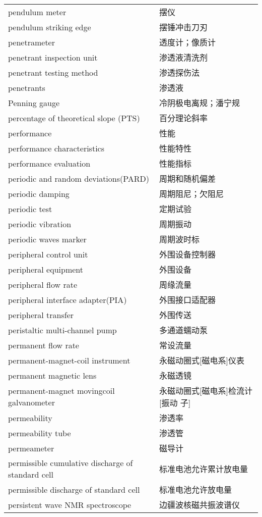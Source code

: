 \documentclass[
]{article}
\begin{document}
\begin{longtable}[]{@{}ll@{}}
pendulum meter & 摆仪 \\
pendulum striking edge & 摆锤冲击刀刃 \\
penetrameter & 透度计；像质计 \\
penetrant inspection unit & 渗透液清洗剂 \\
penetrant testing method & 渗透探伤法 \\
penetrants & 渗透液 \\
Penning gauge & 冷阴极电离规；潘宁规 \\
percentage of theoretical slope (PTS) & 百分理论斜率 \\
performance & 性能 \\
performance characteristics & 性能特性 \\
performance evaluation & 性能指标 \\
periodic and random deviations(PARD) & 周期和随机偏差 \\
periodic damping & 周期阻尼；欠阻尼 \\
periodic test & 定期试验 \\
periodic vibration & 周期振动 \\
periodic waves marker & 周期波时标 \\
peripheral control unit & 外围设备控制器 \\
peripheral equipment & 外围设备 \\
peripheral flow rate & 周缘流量 \\
peripheral interface adapter(PIA) & 外围接口适配器 \\
peripheral transfer & 外围传送 \\
peristaltic multi-channel pump & 多通道蠕动泵 \\
permanent flow rate & 常设流量 \\
permanent-magnet-coil instrument & 永磁动圈式{[}磁电系{]}仪表 \\
permanent magnetic lens & 永磁透镜 \\
permanent-magnet movingcoil galvanometer &
永磁动圈式{[}磁电系{]}检流计{[}振动 子{]} \\
permeability & 渗透率 \\
permeability tube & 渗透管 \\
permeameter & 磁导计 \\
permissible cumulative discharge of standard cell &
标准电池允许累计放电量 \\
permissible discharge of standard cell & 标准电池允许放电量 \\
persistent wave NMR spectroscope & 边疆波核磁共振波谱仪 \\

\end{longtable}
\end{document}
